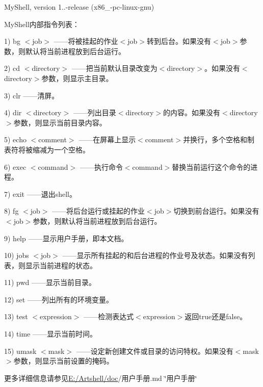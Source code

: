My\+Shell, version 1..-\/release (x86\+\_-\/pc-\/linux-\/gnu)

My\+Shell内部指令列表：

1) bg $<$job$>$ ——将被挂起的作业$<$job$>$转到后台。如果没有$<$job$>$参数，则默认将当前进程放到后台运行。

2) cd $<$directory$>$ ——把当前默认目录改变为$<$directory$>$。如果没有$<$directory$>$参数，则显示主目录。

3) clr ——清屏。

4) dir $<$directory$>$ ——列出目录$<$directory$>$的内容。如果没有$<$directory$>$参数，则显示当前目录内容。

5) echo $<$comment$>$ ——在屏幕上显示$<$comment$>$并换行，多个空格和制表符将被缩减为一个空格。

6) exec $<$command$>$ ——执行命令$<$command$>$替换当前运行这个命令的进程。

7) exit ——退出shell。

8) fg $<$job$>$ ——将后台运行或挂起的作业$<$job$>$切换到前台运行。如果没有$<$job$>$参数，则默认将当前进程放到后台运行。

9) help ——显示用户手册，即本文档。

10) jobs $<$job$>$ ——显示所有挂起的和后台进程的作业号及状态。如果没有列表，则显示当前进程的状态。

11) pwd ——显示当前目录。

12) set ——列出所有的环境变量。

13) test $<$expression$>$ ——检测表达式$<$expression$>$返回true还是false。

14) time ——显示当前时间。

15) umask $<$mask$>$ ——设定新创建文件或目录的访问特权。如果没有$<$mask$>$参数，则显示当前设置的掩码。

更多详细信息请参见\mbox{\hyperlink{dir_e68e8157741866f444e17edd764ebbae}{E\+:/\+Artshell/doc}}/用户手册.md \char`\"{}用户手册\char`\"{} 